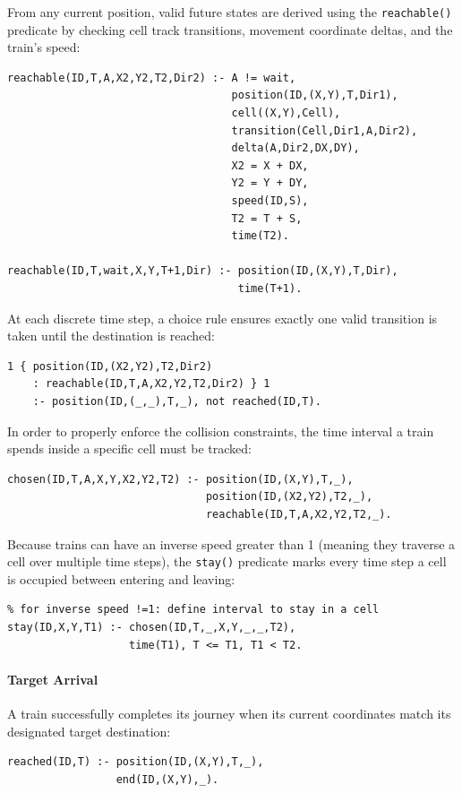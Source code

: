 From any current position, valid future states are derived using the \texttt{reachable()} predicate by checking cell track transitions, movement coordinate deltas, and the train's speed:
\begin{verbatim}
reachable(ID,T,A,X2,Y2,T2,Dir2) :- A != wait,
                                   position(ID,(X,Y),T,Dir1),
                                   cell((X,Y),Cell),
                                   transition(Cell,Dir1,A,Dir2),
                                   delta(A,Dir2,DX,DY),
                                   X2 = X + DX,
                                   Y2 = Y + DY,
                                   speed(ID,S),
                                   T2 = T + S,
                                   time(T2).
                                   
reachable(ID,T,wait,X,Y,T+1,Dir) :- position(ID,(X,Y),T,Dir),
                                    time(T+1).
\end{verbatim}

At each discrete time step, a choice rule ensures exactly one valid transition is taken until the destination is reached:
\begin{verbatim}
1 { position(ID,(X2,Y2),T2,Dir2) 
    : reachable(ID,T,A,X2,Y2,T2,Dir2) } 1 
    :- position(ID,(_,_),T,_), not reached(ID,T).
\end{verbatim}

In order to properly enforce the collision constraints, the time interval a train spends inside a specific cell must be tracked:
\begin{verbatim}
chosen(ID,T,A,X,Y,X2,Y2,T2) :- position(ID,(X,Y),T,_),
                               position(ID,(X2,Y2),T2,_),
                               reachable(ID,T,A,X2,Y2,T2,_).
\end{verbatim}

Because trains can have an inverse speed greater than 1 (meaning they traverse a cell over multiple time steps), the \texttt{stay()} predicate marks every time step a cell is occupied between entering and leaving:
\begin{verbatim}
% for inverse speed !=1: define interval to stay in a cell
stay(ID,X,Y,T1) :- chosen(ID,T,_,X,Y,_,_,T2),
                   time(T1), T <= T1, T1 < T2.
\end{verbatim}

\paragraph{Target Arrival}
A train successfully completes its journey when its current coordinates match its designated target destination:
\begin{verbatim}
reached(ID,T) :- position(ID,(X,Y),T,_),
                 end(ID,(X,Y),_). 
\end{verbatim}

